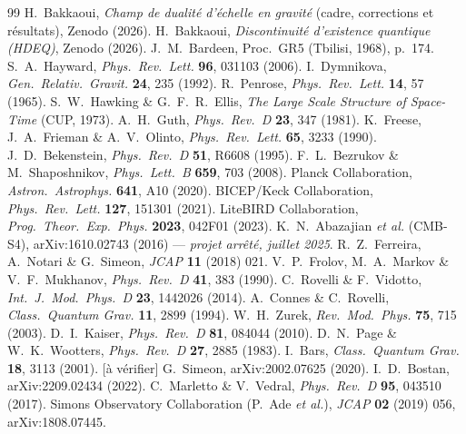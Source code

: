 \documentclass[11pt,a4paper]{article}
\newcommand{\statut}[1]{{\footnotesize\textsf{[#1]}}}
\theoremstyle{definition}
\begin{document}
\begin{thebibliography}{99}\small
{} H.\ Bakkaoui, \textit{Champ de dualit\'e d'\'echelle en gravit\'e} (cadre, corrections et r\'esultats), Zenodo (2026).
 H.\ Bakkaoui, \textit{Discontinuit\'e d'existence quantique (HDEQ)}, Zenodo (2026).
 J.\ M.\ Bardeen, Proc.\ GR5 (Tbilisi, 1968), p.\ 174.
 S.\ A.\ Hayward, \textit{Phys.\ Rev.\ Lett.} \textbf{96}, 031103 (2006).
 I.\ Dymnikova, \textit{Gen.\ Relativ.\ Gravit.} \textbf{24}, 235 (1992).
 R.\ Penrose, \textit{Phys.\ Rev.\ Lett.} \textbf{14}, 57 (1965).
 S.\ W.\ Hawking \& G.\ F.\ R.\ Ellis, \textit{The Large Scale Structure of Space-Time} (CUP, 1973).
 A.\ H.\ Guth, \textit{Phys.\ Rev.\ D} \textbf{23}, 347 (1981).
 K.\ Freese, J.\ A.\ Frieman \& A.\ V.\ Olinto, \textit{Phys.\ Rev.\ Lett.} \textbf{65}, 3233 (1990).
 J.\ D.\ Bekenstein, \textit{Phys.\ Rev.\ D} \textbf{51}, R6608 (1995).
 F.\ L.\ Bezrukov \& M.\ Shaposhnikov, \textit{Phys.\ Lett.\ B} \textbf{659}, 703 (2008).
 Planck Collaboration, \textit{Astron.\ Astrophys.} \textbf{641}, A10 (2020).
 BICEP/Keck Collaboration, \textit{Phys.\ Rev.\ Lett.} \textbf{127}, 151301 (2021).
 LiteBIRD Collaboration, \textit{Prog.\ Theor.\ Exp.\ Phys.} \textbf{2023}, 042F01 (2023).
 K.\ N.\ Abazajian \textit{et al.} (CMB-S4), arXiv:1610.02743 (2016) --- \emph{projet arr\^et\'e, juillet 2025}.
 R.\ Z.\ Ferreira, A.\ Notari \& G.\ Simeon, \textit{JCAP} \textbf{11} (2018) 021.
 V.\ P.\ Frolov, M.\ A.\ Markov \& V.\ F.\ Mukhanov, \textit{Phys.\ Rev.\ D} \textbf{41}, 383 (1990).
 C.\ Rovelli \& F.\ Vidotto, \textit{Int.\ J.\ Mod.\ Phys.\ D} \textbf{23}, 1442026 (2014).
 A.\ Connes \& C.\ Rovelli, \textit{Class.\ Quantum Grav.} \textbf{11}, 2899 (1994).
 W.\ H.\ Zurek, \textit{Rev.\ Mod.\ Phys.} \textbf{75}, 715 (2003).
 D.\ I.\ Kaiser, \textit{Phys.\ Rev.\ D} \textbf{81}, 084044 (2010).
 D.\ N.\ Page \& W.\ K.\ Wootters, \textit{Phys.\ Rev.\ D} \textbf{27}, 2885 (1983).
 I.\ Bars, \textit{Class.\ Quantum Grav.} \textbf{18}, 3113 (2001). \statut{\`a v\'erifier}
 G.\ Simeon, arXiv:2002.07625 (2020).
 I.\ D.\ Bostan, arXiv:2209.02434 (2022).
 C.\ Marletto \& V.\ Vedral, \textit{Phys.\ Rev.\ D} \textbf{95}, 043510 (2017).
 Simons Observatory Collaboration (P.\ Ade \textit{et al.}), \textit{JCAP} \textbf{02} (2019) 056, arXiv:1808.07445.
\end{thebibliography}
\end{document}
